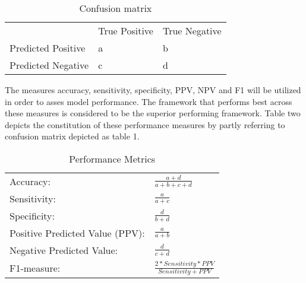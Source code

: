 \documentclass{article}
\begin{document}
\bgroup
\def\arraystretch{1.6}%
\begin{table}[h]
\centering
\caption{Confusion matrix}
\label{tab:my-table}
\begin{tabular}{lll}
                                        & True Positive          & True Negative          \\ \cline{2-3} 
\multicolumn{1}{l|}{Predicted Positive} & \multicolumn{1}{l|}{a} & \multicolumn{1}{l|}{b} \\ \cline{2-3} 
\multicolumn{1}{l|}{Predicted Negative} & \multicolumn{1}{l|}{c} & \multicolumn{1}{l|}{d} \\ \cline{2-3} 
\end{tabular}
\end{table}
\egroup

The measures accuracy, sensitivity, specificity, PPV, NPV and F1 will be utilized in order to asses model performance. The framework that performs best across these measures is considered to be the superior performing framework. Table two depicts the constitution of these performance measures by partly referring to confusion matrix depicted as table 1. 
\bgroup
\def\arraystretch{1.8}%
\begin{table}[h]
\centering
\caption{Performance Metrics}
\label{tab:my-table}
\begin{tabular}{ll}
\hline
Accuracy:                       & \(\frac{\!\!\!\!\!\!\!\!\!\!\!\!\!\!a+d}{a+b+c+d}\) \\
Sensitivity:                    & \(\frac{a}{a+c}\)                                   \\
Specificity:                    & \(\frac{d}{b+d}\)                                   \\
Positive Predicted Value (PPV): & \(\frac{a}{a+b}\)                                   \\
Negative Predicted Value:       & \(\frac{d}{c+d}\)                                   \\
F1-measure:                     & \(\frac{2*Sensitivity*PPV}{Sensitivity+PPV}\)       \\ \hline
\end{tabular}
\end{table}
\egroup

\newpage



\end{document}
